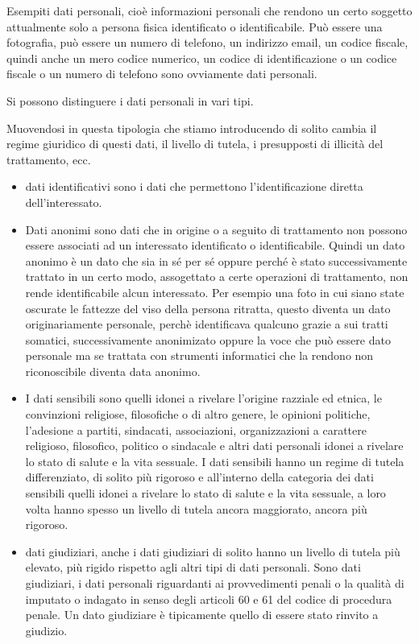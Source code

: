 Esempiti dati personali, cioè informazioni personali che rendono un certo soggetto attualmente solo a persona fisica identificato o identificabile. Può essere una fotografia, può essere un numero di telefono, un indirizzo email, un codice fiscale, quindi anche un mero codice numerico, un codice di identificazione o un codice fiscale o un numero di telefono sono ovviamente dati personali. 

Si possono distinguere i dati personali in vari tipi. 

Muovendosi in questa tipologia che stiamo introducendo di solito cambia il regime giuridico di questi dati, il livello di tutela, i presupposti di illicità del trattamento, ecc. 

\begin{itemize}
    \item dati identificativi sono i dati che permettono l'identificazione diretta dell'interessato.
    \item  Dati anonimi sono dati che in origine o a seguito di trattamento non possono essere associati ad un interessato identificato o identificabile. Quindi un dato anonimo è un dato che sia in sé per sé oppure perché è stato successivamente trattato in un certo modo, assogettato a certe operazioni di trattamento, non rende identificabile alcun interessato. Per esempio una foto in cui siano state oscurate le fattezze del viso della persona ritratta, questo diventa un dato originariamente personale, perchè identificava qualcuno grazie a sui tratti somatici, successivamente anonimizato oppure la voce che può essere dato personale ma se trattata con strumenti informatici che la rendono non riconoscibile diventa data anonimo.
    \item I dati sensibili sono quelli idonei a rivelare l'origine razziale ed etnica, le convinzioni religiose, filosofiche o di altro genere, le opinioni politiche, l'adesione a partiti, sindacati, associazioni, organizzazioni a carattere religioso, filosofico, politico o sindacale e altri dati personali idonei a rivelare lo stato di salute e la vita sessuale. I dati sensibili hanno un regime di tutela differenziato, di solito più rigoroso e all'interno della categoria dei dati sensibili quelli idonei a rivelare lo stato di salute e la vita sessuale, a loro volta hanno spesso un livello di tutela ancora maggiorato, ancora più rigoroso.
    \item dati giudiziari, anche i dati giudiziari di solito hanno un livello di tutela più elevato, più rigido rispetto agli altri tipi di dati personali. Sono dati giudiziari, i dati personali riguardanti ai provvedimenti penali o la qualità di imputato o indagato in senso degli articoli 60 e 61 del codice di procedura penale. Un dato giudiziare è tipicamente quello  di essere stato rinvito a giudizio.
\end{itemize}


